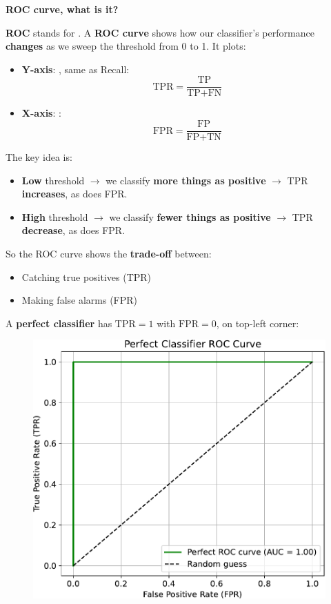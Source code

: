 \highspace
\begin{flushleft}
    \textcolor{Green3}{ \textbf{ROC curve, what is it?}}
\end{flushleft}
\textbf{ROC} stands for . A \textbf{ROC curve} shows how our classifier's performance \textbf{changes} as we sweep the threshold from 0 to 1. It plots:
\begin{itemize}
    \item \textbf{Y-axis}: , same as Recall:
    \begin{equation}
        \text{TPR} = \dfrac{\text{TP}}{\text{TP} + \text{FN}}
    \end{equation}
    \item \textbf{X-axis}: :
    \begin{equation}
        \text{FPR} = \dfrac{\text{FP}}{\text{FP} + \text{TN}}
    \end{equation}
\end{itemize}
The key idea is:
\begin{itemize}
    \item \textbf{Low} threshold $\rightarrow$ we classify \textbf{more things as positive} $\rightarrow$ TPR \textbf{increases}, as does FPR.
    \item \textbf{High} threshold $\rightarrow$ we classify \textbf{fewer things as positive} $\rightarrow$ TPR \textbf{decrease}, as does FPR.
\end{itemize}
So the ROC curve shows the \textbf{trade-off} between:
\begin{itemize}
    \item Catching true positives (TPR)
    \item Making false alarms (FPR)
\end{itemize}

\newpage

\noindent
A \textbf{perfect classifier} has $\text{TPR} = 1$ with $\text{FPR} = 0$, on top-left corner:
\begin{figure}[!htp]
    \centering
    \includegraphics[width=.9\textwidth]{img/logistic-regression/perfect-classifier-roc.pdf}
\end{figure}

